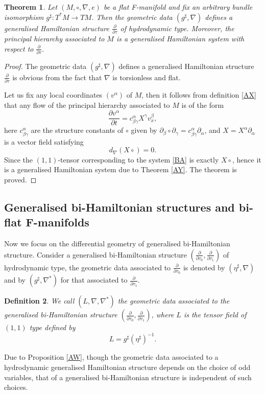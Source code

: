 \documentclass[11pt,a4paper]{amsart}
\numberwithin{equation}{section}
\newtheorem{theorem}{Theorem}[section]
\newtheorem{definition}[theorem]{Definition}
\newcommand{\diff}[2]{\frac{\partial #1}{\partial #2}}
\newcommand{\qa}{\alpha}
\newcommand{\qb}{\beta}
\newcommand{\qg}{\gamma}
\newcommand{\qt}{\tau}
\newcommand{\qp}{\partial}
\numberwithin{equation}{section}
\begin{document}
\begin{theorem}
  \label{BD}
  Let $(M, \circ, \nabla, e)$ be a flat F-manifold and fix an arbitrary bundle isomorphism $g^\sharp\colon T^*M\to TM$. Then the geometric data $(g^\sharp,\nabla)$ defines a generalised Hamiltonian structure $\diff{}{\qt}$ of hydrodynamic type. Moreover, the principal hierarchy associated to $M$ is a generalised Hamiltonian system with respect to  $\diff{}{\qt}$.
\end{theorem}
\begin{proof}
  The geometric data $(g^\sharp,\nabla)$ defines a generalised Hamiltonian structure $\diff{}{\qt}$ is obvious from the fact that $\nabla$ is torsionless and flat.

  Let us fix any local coordinates $(v^\qa)$ of $M$, then it follows from definition \eqref{AX} that any flow of the principal hierarchy associated to $M$ is of the form 
  \begin{equation}
    \label{BA}
  \diff{v^\qa}{t} = c^\qa_{\qb\qg}X^\qg v^\qb_x,
  \end{equation}
  here $c^\qa_{\qb\qg}$ are the structure constants of $\circ$ given by $\qp_\qb\circ \qp_\qg = c^\qa_{\qb\qg}\qp_\qa$, and $X = X^\qa \qp_\qa$ is a vector field satisfying
  \[
  d_\nabla(X\circ) = 0.
  \]
  Since the $(1,1)$-tensor corresponding to the system \eqref{BA} is exactly $X\circ$, hence it is a generalised Hamiltonian system due to Theorem \ref{AY}. The theorem is proved.
\end{proof}

\subsection{Generalised bi-Hamiltonian structures and bi-flat F-manifolds} Now we focus on the differential geometry of generalised bi-Hamiltonian structure.
Consider a generalised bi-Hamiltonian structure $(\diff{}{\qt_0},\diff{}{\qt_1})$ of hydrodynamic type, the geometric data associated to $\diff{}{\qt_0}$ is denoted by $(\eta^\sharp,\nabla)$ and by $(g^\sharp,\nabla^*)$ for that associated to $\diff{}{\qt_1}$.
\begin{definition}
We call $(L,\nabla,\nabla^*)$ the geometric data associated to the generalised bi-Hamiltonian structure $(\diff{}{\qt_0},\diff{}{\qt_1})$, where $L$ is the tensor field of $(1,1)$ type defined by
\[
L = g^\sharp(\eta^\sharp)^{-1}.
\]
\end{definition}
Due to Proposition \ref{AW}, though the geometric data associated to a hydrodynamic generalised Hamiltonian structure depends on the choice of odd variables, that of a generalised bi-Hamiltonian structure is independent of such choices.
\end{document}
